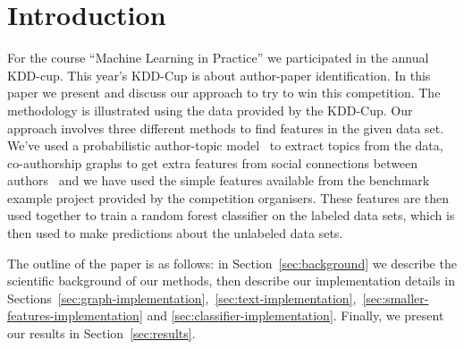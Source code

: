 \section{Introduction}

For the course ``Machine Learning in Practice'' we participated in the annual KDD-cup.
This year's KDD-Cup is about author-paper identification.
In this paper we present and discuss our approach to try to win this competition.
The methodology is illustrated using the data provided by the KDD-Cup.
Our approach involves three different methods to find features in the given data set.
We've used a probabilistic author-topic model~\cite{steyvers2004probabilistic} to extract topics from  the data, co-authorship graphs to get extra features from social connections between authors~\cite{liu2005co} and we have used the simple features available from the benchmark example project provided by the competition organisers.
These features are then used together to train a random forest classifier on the labeled data sets, which is then used to make predictions about the unlabeled data sets.

The outline of the paper is as follows: in Section~\ref{sec:background} we describe the scientific background of our methods, then describe our implementation details in Sections~\ref{sec:graph-implementation},~\ref{sec:text-implementation},~\ref{sec:smaller-features-implementation} and \ref{sec:classifier-implementation}. Finally, we present our results in Section~\ref{sec:results}.
